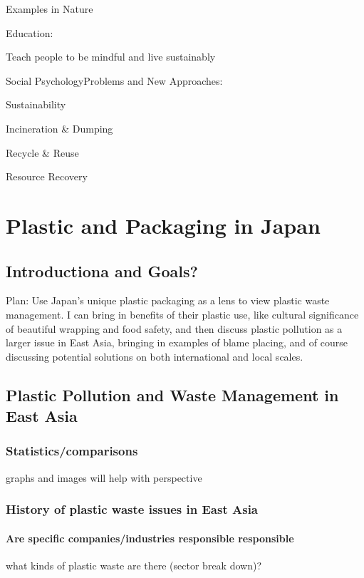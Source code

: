 \documentclass{book}\usepackage{knitr}
\begin{document}
Examples in Nature

Education:

Teach people to be mindful and live sustainably

Social PsychologyProblems and New Approaches: 

Sustainability

Incineration \& Dumping

Recycle \& Reuse

Resource Recovery


\chapter{Plastic and Packaging in Japan}

\section{Introductiona and Goals?}

Plan: Use Japan's unique plastic packaging as a lens to view plastic waste management. I can bring in benefits of their plastic use, like cultural significance of beautiful wrapping and food safety, and then discuss plastic pollution as a larger issue in East Asia, bringing in examples of blame placing, and of course discussing potential solutions on both international and local scales. 

\section{Plastic Pollution and Waste Management in East Asia} 

\subsection{Statistics/comparisons}

graphs and images will help with perspective

\subsection{History of plastic waste issues in East Asia}

\subsubsection{Are specific companies/industries responsible responsible}

what kinds of plastic waste are there (sector break down)? 
\end{document}
